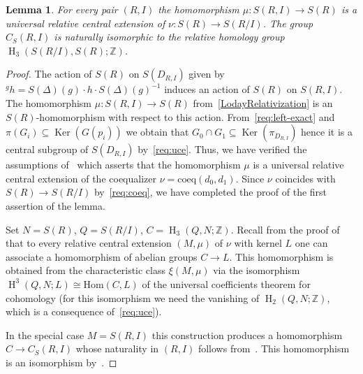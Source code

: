 \documentclass[10pt,a4paper,twoside]{article}
\newtheorem{lemma}{Lemma}
\theoremstyle{remark}
\theoremstyle{definition}
\numberwithin{lemma}{section}
\numberwithin{prop}{section}
\numberwithin{corollary}{section}
\numberwithin{externaltheorem}{section}
\DeclareMathOperator{\Ker}{Ker}
\DeclareMathOperator{\HH}{H}
\newcommand{\ZZ}{\mathbb{Z}}
\numberwithin{equation}{section}
\begin{document}
\begin{lemma}\label{lem:relativeH3}
 For every pair $(R, I)$ the homomorphism $\mu \colon S(R, I) \to S(R)$ is a universal relative central extension of $\nu \colon S(R) \to S(R/I)$. The group $C_S(R, I)$ is naturally isomorphic to the relative homology group $\HH_3(S(R/I), S(R); \ZZ)$.
\end{lemma}
\begin{proof}
The action of $S(R)$ on $S(D_{R, I})$ given by ${}^g h = S(\Delta)(g) \cdot h \cdot S(\Delta)(g)^{-1}$ induces an action of $S(R)$ on $S(R, I)$.
The homomorphism $\mu \colon S(R, I) \to S(R)$ from~\eqref{LodayRelativization} is an $S(R)$-homomorphism with respect to this action.
From~\ref{req:left-exact} and $\pi(G_i) \subseteq \Ker(G(p_i))$ we obtain that 
$G_0 \cap G_1 \subseteq \Ker(\pi_{D_{R, I}})$ hence it is a central subgroup of $S(D_{R,I})$ by~\ref{req:uce}. Thus, we have verified the assumptions of~\cite[Proposition~6]{Lo78} which asserts that the homomorphism $\mu$ is a universal relative central extension of the coequalizer $\nu = \mathrm{coeq}(d_0, d_1)$. Since $\nu$ coincides with $S(R) \to S(R/I)$ by~\ref{req:coeq}, we have completed the proof of the first assertion of the lemma.

Set $N = S(R)$, $Q = S(R/I)$, $C = \HH_3(Q, N; \ZZ)$. Recall from the proof of~\cite[Th{\'e}or{\`e}me~2]{Lo78} that to every relative central extension $(M, \mu)$ of $\nu$ with kernel $L$ one can associate a homomorphism of abelian groups $C \to L$. This homomorphism is obtained from the characteristic class $\xi(M, \mu)$ via the isomorphism $\HH^3(Q, N; L) \cong \mathrm{Hom}(C, L)$ of the universal coefficients theorem for cohomology (for this isomorphism we need the vanishing of $\HH_2(Q, N; \ZZ)$, which is a consequence of~\ref{req:uce}).

In the special case $M = S(R, I)$ this construction produces a homomorphism $C \to C_{S}(R, I)$ whose naturality in $(R, I)$ follows from~\cite[Proposition~3]{Lo78}. 
This homomorphism is an isomorphism by~\cite[Th{\'e}or{\`e}me~2]{Lo78}. \end{proof}
\end{document}
